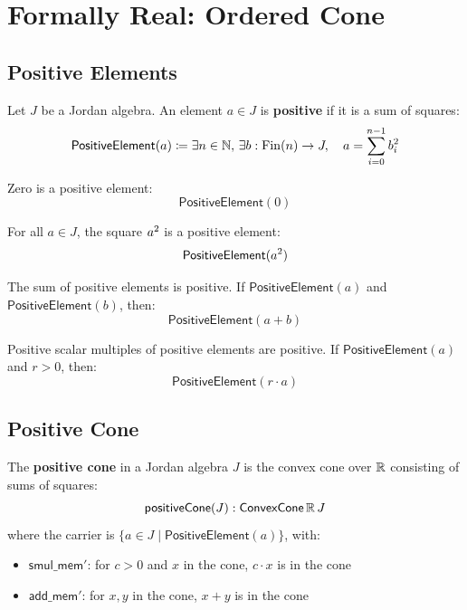 \section{Formally Real: Ordered Cone}

\subsection{Positive Elements}

\begin{definition}[PositiveElement]
Let $J$ be a Jordan algebra. An element $a \in J$ is \textbf{positive} if it is a sum of squares:
\[ \mathsf{PositiveElement}(a) \coloneqq \exists n \in \mathbb{N},\, \exists b : \mathrm{Fin}(n) \to J,\quad a = \sum_{i=0}^{n-1} b_i^{2} \]
\end{definition}

\begin{theorem}
Zero is a positive element:
\[ \mathsf{PositiveElement}(0) \]
\end{theorem}

\begin{theorem}
For all $a \in J$, the square $a^{2}$ is a positive element:
\[ \mathsf{PositiveElement}(a^{2}) \]
\end{theorem}

\begin{theorem}
The sum of positive elements is positive. If $\mathsf{PositiveElement}(a)$ and $\mathsf{PositiveElement}(b)$, then:
\[ \mathsf{PositiveElement}(a + b) \]
\end{theorem}

\begin{theorem}
Positive scalar multiples of positive elements are positive. If $\mathsf{PositiveElement}(a)$ and $r > 0$, then:
\[ \mathsf{PositiveElement}(r \cdot a) \]
\end{theorem}

\subsection{Positive Cone}

\begin{definition}[positiveCone]
The \textbf{positive cone} in a Jordan algebra $J$ is the convex cone over $\mathbb{R}$ consisting of sums of squares:
\[ \mathsf{positiveCone}(J) : \mathsf{ConvexCone}\,\mathbb{R}\,J \]
where the carrier is $\{ a \in J \mid \mathsf{PositiveElement}(a) \}$, with:
\begin{itemize}
  \item $\mathsf{smul\_mem'}$: for $c > 0$ and $x$ in the cone, $c \cdot x$ is in the cone
  \item $\mathsf{add\_mem'}$: for $x, y$ in the cone, $x + y$ is in the cone
\end{itemize}
\end{definition}

